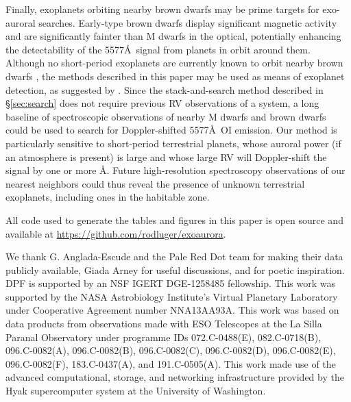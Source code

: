 \documentclass{emulateapj}
\begin{document}
Finally, exoplanets orbiting nearby brown dwarfs may be prime targets for exo-auroral searches. Early-type brown dwarfs display significant magnetic activity \citep{West2008} and are significantly fainter than M dwarfs in the optical, potentially enhancing the detectability of the 5577\AA\ signal from planets in orbit around them. Although no short-period exoplanets are currently known to orbit nearby brown dwarfs \citep{He2016}, the methods described in this paper may be used as means of exoplanet detection, as suggested by \citet{SparksFord2002}. Since the stack-and-search method described in \S\ref{sec:search} does not require previous RV observations of a system, a long baseline of spectroscopic observations of nearby M dwarfs and brown dwarfs could be used to search for Doppler-shifted 5577\AA\ OI emission. Our method is particularly sensitive to short-period terrestrial planets, whose auroral power (if an atmosphere is present) is large and whose large RV will Doppler-shift the signal by one or more \AA. Future high-resolution spectroscopy observations of our nearest neighbors could thus reveal the presence of unknown terrestrial exoplanets, including ones in the habitable zone.

All code used to generate the tables and figures in this paper is open source and available at \url{https://github.com/rodluger/exoaurora}.

\pagebreak

\acknowledgments

We thank G. Anglada-Escude and the Pale Red Dot team for making their data publicly available, Giada Arney for useful discussions, and \citet{Service1907} for poetic inspiration. DPF is supported by an NSF IGERT DGE-1258485 fellowship. This work was supported by the NASA Astrobiology Institute’s Virtual Planetary Laboratory under Cooperative Agreement number NNA13AA93A. This work was based on data products from observations made with ESO Telescopes at the La Silla Paranal Observatory under programme IDs 072.C-0488(E), 082.C-0718(B), 096.C-0082(A), 096.C-0082(B), 096.C-0082(C), 096.C-0082(D), 096.C-0082(E), 096.C-0082(F), 183.C-0437(A), and 191.C-0505(A). This work made use of the advanced computational, storage, and networking infrastructure provided by the Hyak supercomputer system at the University of Washington.



\end{document}
